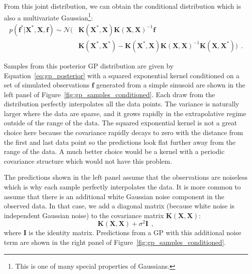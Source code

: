 \documentclass[12pt,dvipsnames]{report}
\renewcommand{\vec}[1]{\boldsymbol{\mathbf{#1}}}
\newcommand{\hquad}{~~}
\begin{document}
From this joint distribution, we can obtain the conditional  distribution
\citep[see appendix A2 in ][]{rasmussen2006} which is also a multivariate Gaussian\footnote{
    This is one of many special properties of Gaussians.
}:
\begin{align}
    p(\mathbf{f}^{*} \lvert \vec X^{*}, \vec X, \mathbf{f} )\sim \mathcal{N}( & \vec K\left(\vec X^*, \vec X\right) \vec K(\vec X, \vec X)^{-1} \mathbf{f}                                                          \\
                                                                              & \vec K\left(\vec X^*, \vec X^*\right)  -\vec K\left(\vec X^*, \vec X \right) \vec K(\vec X, \vec X)^{-1} \vec K (\vec X, \vec X^*))
    \hquad.
    \label{eq:gp_posterior}
\end{align}

Samples from this posterior GP distribution are given by
Equation~\ref{eq:gp_posterior} with a squared exponential kernel conditioned on
a set of simulated observations $\vec{f}$ generated from a simple sinusoid are
shown in the left panel of Figure~\ref{fig:gp_samples_conditioned}. Each draw
from the distribution perfectly interpolates all the data points. The variance
is naturally larger where the data are sparse, and it 
grows rapidly in the extrapolative regime outside of the range of
the data. The squared exponential kernel is not a great choice here because the
covariance rapidly decays to zero with the distance from the first and last
data point so the predictions look flat further away from the range of the
data. A much better choice would be a kernel with a periodic covariance
structure which would not have this problem.

The predictions shown in the left panel assume that the observations are
noiseless which is why each sample perfectly interpolates the data. It is more
common to assume that there is an additional white Gaussian noise component in
the observed data. In that case, we add a diagonal matrix (because white noise
is independent Gaussian noise) to the covariance matrix
$\vec{K}(\vec{X},\vec{X})$:
\begin{equation}
    \vec{K}(\vec{X},\vec{X}) + \sigma^2\vec{I}
    \hquad,
\end{equation}
where $\vec{I}$ is the identity matrix. Predictions from a GP with this additional
noise term are shown in the right panel of Figure~\ref{fig:gp_samples_conditioned}.
\end{document}
